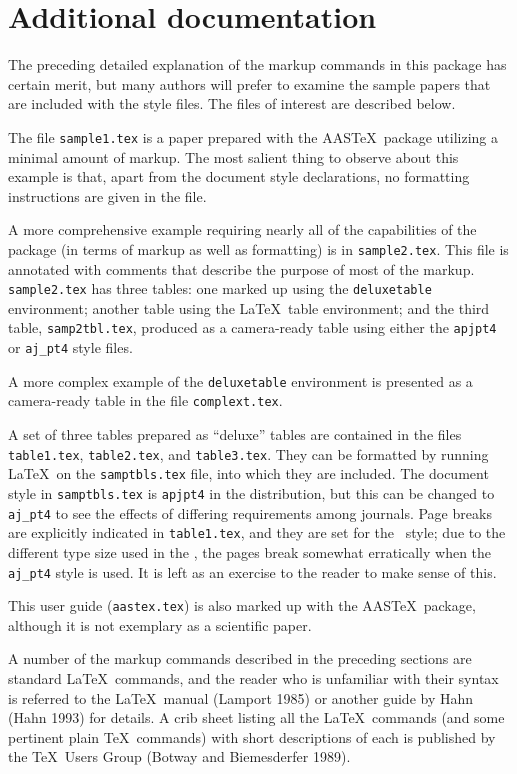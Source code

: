 \section{Additional documentation}  \label{docs}

The preceding detailed explanation of the markup commands in this
package has certain merit, but many authors will prefer to examine
the sample papers that are included with the style files.
The files of interest are described below.

The file \verb"sample1.tex" is a paper prepared
with the AAS\TeX\ package utilizing a minimal amount of markup.
The most salient thing to observe about this example is that,
apart from the document style declarations, no formatting
instructions are given in the file.

A more comprehensive example requiring nearly all of the capabilities
of the package (in terms of markup as well as formatting)
is in \verb"sample2.tex".
This file is annotated with comments that describe
the purpose of most of the markup.
\verb"sample2.tex" has three tables: one marked up using the 
{\tt deluxetable} environment; another table using the \LaTeX\ table 
environment; and the third table, \verb"samp2tbl.tex", produced as a 
camera-ready table using
either the \verb"apjpt4" or \verb"aj_pt4" style files.

A more complex example of the {\tt deluxetable} environment is presented
as a camera-ready table in the file \verb"complext.tex".

A set of three tables prepared as ``deluxe'' tables are contained in
the files \verb"table1.tex", \verb"table2.tex", and
\verb"table3.tex".  They can be formatted by running \LaTeX\ on
the \verb"samptbls.tex" file, into which they are included.
The document style in \verb"samptbls.tex" is {\tt apjpt4} in the
distribution, but this can be changed to \verb"aj_pt4" to see the
effects of differing requirements among journals.
Page breaks are explicitly indicated in \verb"table1.tex",
and they are set for the \apj\ style; due to the different
type size used in the \aj, the pages break somewhat erratically
when the \verb"aj_pt4" style is used.  It is left as an exercise
to the reader to make sense of this.

This user guide (\verb"aastex.tex")
is also marked up with the AAS\TeX\ package,
although it is not exemplary as a scientific paper.

A number of the markup commands described in the preceding
sections are standard \LaTeX\ commands, and the reader who is
unfamiliar with their syntax is referred to the \LaTeX\
manual (Lamport 1985) or another guide by Hahn (Hahn 1993) for details. 
A crib sheet listing all
the \LaTeX\ commands (and some pertinent plain \TeX\ commands)
with short descriptions of each is published by the \TeX\ Users
Group (Botway and Biemesderfer 1989).

